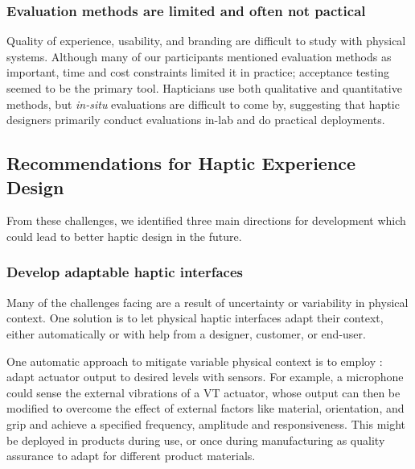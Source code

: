     
    \subsubsection{Evaluation methods are limited and often not pactical}
    \noindent
    Quality of experience, usability, and branding are difficult to study with physical systems.
    Although many of our participants mentioned evaluation methods as important, time and cost constraints limited it in practice; %
    acceptance testing seemed to be the primary tool. %
    Hapticians use both qualitative and quantitative methods, but \emph{in-situ} evaluations are difficult to come by, suggesting that haptic designers primarily conduct evaluations in-lab and do practical deployments. %



\subsection{Recommendations for Haptic Experience Design}
\noindent
From these challenges, we identified three main directions for development which %
could lead to better haptic design in the future.

\subsubsection{Develop adaptable haptic interfaces}
\noindent
    Many of the challenges facing  are a result of uncertainty or variability in physical context.
    One solution is to  let physical haptic interfaces adapt their context, either automatically or with help from a designer, customer, or end-user.
        
    One automatic approach to mitigate variable physical context is to employ : adapt actuator output to desired levels with sensors.
    For example, a microphone could  sense the external vibrations of a VT actuator, {whose}  output can then be modified to overcome the effect of external factors like material, orientation, and grip and achieve a specified frequency, amplitude and responsiveness. 
    This might be deployed in products during use, or once during manufacturing as quality assurance to adapt for different product materials.

